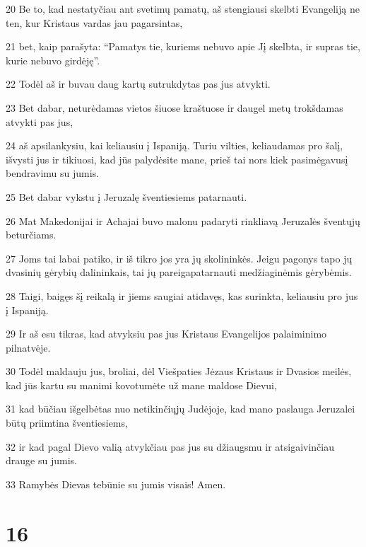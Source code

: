\par 20 Be to, kad nestatyčiau ant svetimų pamatų, aš stengiausi skelbti Evangeliją ne ten, kur Kristaus vardas jau pagarsintas, 
\par 21 bet, kaip parašyta: “Pamatys tie, kuriems nebuvo apie Jį skelbta, ir supras tie, kurie nebuvo girdėję”. 
\par 22 Todėl aš ir buvau daug kartų sutrukdytas pas jus atvykti. 
\par 23 Bet dabar, neturėdamas vietos šiuose kraštuose ir daugel metų trokšdamas atvykti pas jus, 
\par 24 aš apsilankysiu, kai keliausiu į Ispaniją. Turiu vilties, keliaudamas pro šalį, išvysti jus ir tikiuosi, kad jūs palydėsite mane, prieš tai nors kiek pasimėgavusį bendravimu su jumis. 
\par 25 Bet dabar vykstu į Jeruzalę šventiesiems patarnauti. 
\par 26 Mat Makedonijai ir Achajai buvo malonu padaryti rinkliavą Jeruzalės šventųjų beturčiams. 
\par 27 Joms tai labai patiko, ir iš tikro jos yra jų skolininkės. Jeigu pagonys tapo jų dvasinių gėrybių dalininkais, tai jų pareiga­patarnauti medžiaginėmis gėrybėmis. 
\par 28 Taigi, baigęs šį reikalą ir jiems saugiai atidavęs, kas surinkta, keliausiu pro jus į Ispaniją. 
\par 29 Ir aš esu tikras, kad atvyksiu pas jus Kristaus Evangelijos palaiminimo pilnatvėje. 
\par 30 Todėl maldauju jus, broliai, dėl Viešpaties Jėzaus Kristaus ir Dvasios meilės, kad jūs kartu su manimi kovotumėte už mane maldose Dievui, 
\par 31 kad būčiau išgelbėtas nuo netikinčiųjų Judėjoje, kad mano paslauga Jeruzalei būtų priimtina šventiesiems, 
\par 32 ir kad pagal Dievo valią atvykčiau pas jus su džiaugsmu ir atsigaivinčiau drauge su jumis. 
\par 33 Ramybės Dievas tebūnie su jumis visais! Amen.


\chapter{16}


